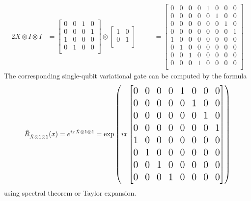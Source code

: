 \documentclass[inscr,ack,preface]{diphdthesis}
\begin{document}
\begin{alignat*}{2}
X \otimes I \otimes I &= \begin{bmatrix}
    0 & 0 & 1 & 0 \\
    0 & 0 & 0 & 1 \\
    1 & 0 & 0 & 0 \\
    0 & 1 & 0 & 0 \\
\end{bmatrix} \otimes \begin{bmatrix}
    1 & 0 \\
    0 & 1 \\
\end{bmatrix} &\quad&
= \begin{bmatrix}
    0 & 0 & 0 & 0 & 1 & 0 & 0 & 0 \\
    0 & 0 & 0 & 0 & 0 & 1 & 0 & 0 \\
    0 & 0 & 0 & 0 & 0 & 0 & 1 & 0 \\
    0 & 0 & 0 & 0 & 0 & 0 & 0 & 1 \\
    1 & 0 & 0 & 0 & 0 & 0 & 0 & 0 \\
    0 & 1 & 0 & 0 & 0 & 0 & 0 & 0 \\
    0 & 0 & 1 & 0 & 0 & 0 & 0 & 0 \\
    0 & 0 & 0 & 1 & 0 & 0 & 0 & 0 \\
\end{bmatrix}
\end{alignat*}
The corresponding single-qubit variational gate can be computed by the formula
\[\Large
\hat{R}_{\hat{X}\otimes 1\otimes1}(x) = e^{i x \hat{X}\otimes 1\otimes1} = \exp \left( i x \begin{bmatrix}
    0 & 0 & 0 & 0 & 1 & 0 & 0 & 0 \\
    0 & 0 & 0 & 0 & 0 & 1 & 0 & 0 \\
    0 & 0 & 0 & 0 & 0 & 0 & 1 & 0 \\
    0 & 0 & 0 & 0 & 0 & 0 & 0 & 1 \\
    1 & 0 & 0 & 0 & 0 & 0 & 0 & 0 \\
    0 & 1 & 0 & 0 & 0 & 0 & 0 & 0 \\
    0 & 0 & 1 & 0 & 0 & 0 & 0 & 0 \\
    0 & 0 & 0 & 1 & 0 & 0 & 0 & 0 \\
\end{bmatrix}\right)\]
\normalsize  
using spectral theorem or Taylor expansion.
\end{document}
